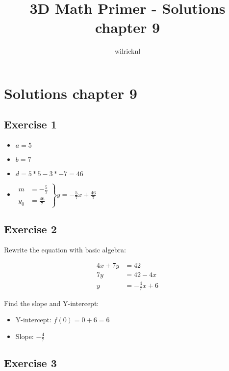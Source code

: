 \documentclass[11pt]{article}
\author{wilricknl}
\title{3D Math Primer - Solutions chapter 9}
\begin{document}
\maketitle

\section{Solutions chapter 9 }

\subsection{Exercise 1}

\begin{itemize}
	\item $a=5$
	\item $b=7$
	\item $d=5*5-3*-7=46$
	\item $
	\left.
	\begin{aligned}
		m &= -\frac{5}{7} \\
		y_0 &= \frac{46}{7} 
		\end{aligned}
	\right\} y = -\frac{5}{7}x + \frac{46}{7}
	$
\end{itemize}

\subsection{Exercise 2}

Rewrite the equation with basic algebra:

\begin{align*} 
4x + 7y &= 42 \\ 
7y &= 42 - 4x \\
y &= -\frac{4}{7}x + 6
\end{align*}

\noindent Find the slope and Y-intercept:

\begin{itemize}
	\item Y-intercept: $f(0)=0+6=6$
	\item Slope: $-\frac{4}{7}$
\end{itemize}

\subsection{Exercise 3}
\end{document}
